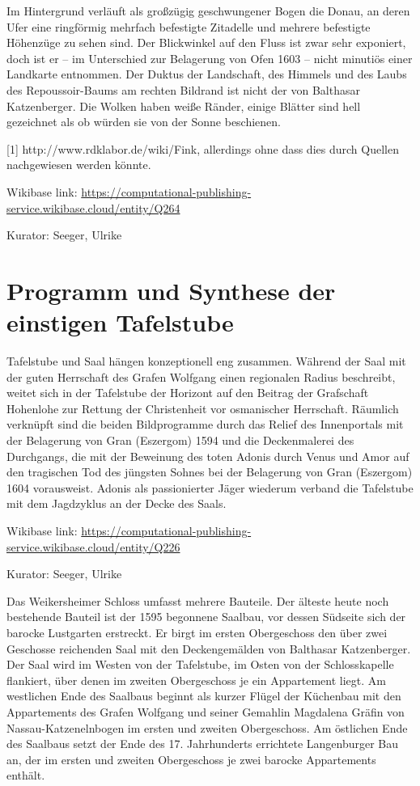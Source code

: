 \documentclass[
  letterpaper,
]{book}
\begin{document}
Im Hintergrund verläuft als großzügig geschwungener Bogen die Donau, an
deren Ufer eine ringförmig mehrfach befestigte Zitadelle und mehrere
befestigte Höhenzüge zu sehen sind. Der Blickwinkel auf den Fluss ist
zwar sehr exponiert, doch ist er -- im Unterschied zur Belagerung von
Ofen 1603 -- nicht minutiös einer Landkarte entnommen. Der Duktus der
Landschaft, des Himmels und des Laubs des Repoussoir-Baums am rechten
Bildrand ist nicht der von Balthasar Katzenberger. Die Wolken haben
weiße Ränder, einige Blätter sind hell gezeichnet als ob würden sie von
der Sonne beschienen.

{[}1{]} http://www.rdklabor.de/wiki/Fink, allerdings ohne dass dies
durch Quellen nachgewiesen werden könnte.

Wikibase link:
\url{https://computational-publishing-service.wikibase.cloud/entity/Q264}

Kurator: Seeger, Ulrike

\section{Programm und Synthese der einstigen
Tafelstube}\label{programm-und-synthese-der-einstigen-tafelstube}

Tafelstube und Saal hängen konzeptionell eng zusammen. Während der Saal
mit der guten Herrschaft des Grafen Wolfgang einen regionalen Radius
beschreibt, weitet sich in der Tafelstube der Horizont auf den Beitrag
der Grafschaft Hohenlohe zur Rettung der Christenheit vor osmanischer
Herrschaft. Räumlich verknüpft sind die beiden Bildprogramme durch das
Relief des Innenportals mit der Belagerung von Gran (Eszergom) 1594 und
die Deckenmalerei des Durchgangs, die mit der Beweinung des toten Adonis
durch Venus und Amor auf den tragischen Tod des jüngsten Sohnes bei der
Belagerung von Gran (Eszergom) 1604 vorausweist. Adonis als
passionierter Jäger wiederum verband die Tafelstube mit dem Jagdzyklus
an der Decke des Saals.

Wikibase link:
\url{https://computational-publishing-service.wikibase.cloud/entity/Q226}

Kurator: Seeger, Ulrike

Das Weikersheimer Schloss umfasst mehrere Bauteile. Der älteste heute
noch bestehende Bauteil ist der 1595 begonnene Saalbau, vor dessen
Südseite sich der barocke Lustgarten erstreckt. Er birgt im ersten
Obergeschoss den über zwei Geschosse reichenden Saal mit den
Deckengemälden von Balthasar Katzenberger. Der Saal wird im Westen von
der Tafelstube, im Osten von der Schlosskapelle flankiert, über denen im
zweiten Obergeschoss je ein Appartement liegt. Am westlichen Ende des
Saalbaus beginnt als kurzer Flügel der Küchenbau mit den Appartements
des Grafen Wolfgang und seiner Gemahlin Magdalena Gräfin von
Nassau-Katzenelnbogen im ersten und zweiten Obergeschoss. Am östlichen
Ende des Saalbaus setzt der Ende des 17. Jahrhunderts errichtete
Langenburger Bau an, der im ersten und zweiten Obergeschoss je zwei
barocke Appartements enthält.
\end{document}
